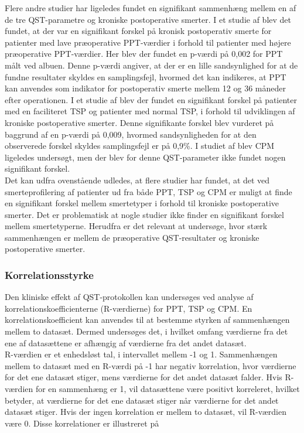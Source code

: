 Flere andre studier har ligeledes fundet en signifikant sammenhæng mellem en af de tre QST-parametre og kroniske postoperative smerter. \citep{Wylde2013} \citep{Wright2015} I et studie af  blev det fundet, at der var en signifikant forskel på kronisk postoperativ smerte for patienter med lave præoperative PPT-værdier i forhold til patienter med højere præoperative PPT-værdier. Her blev der fundet en p-værdi på 0,002 for PPT målt ved albuen. Denne p-værdi angiver, at der er en lille sandsynlighed for at de fundne resultater skyldes en samplingsfejl, hvormed det kan indikeres, at PPT kan anvendes som indikator for postoperativ smerte mellem 12 og 36 måneder efter operationen. \citep{Wright2015} I et studie af  blev der fundet en signifikant forskel på patienter med en faciliteret TSP og patienter med normal TSP, i forhold til udviklingen af kroniske postoperative smerter. Denne signifikante forskel blev vurderet på baggrund af en p-værdi på 0,009, hvormed sandsynligheden for at den observerede forskel skyldes samplingsfejl er på 0,9\%. I studiet af  blev CPM ligeledes undersøgt, men der blev for denne QST-parameter ikke fundet nogen signifikant forskel. \\
Det kan udfra ovenstående udledes, at flere studier har fundet, at det ved smerteprofilering af patienter ud fra både PPT, TSP og CPM er muligt at finde en signifikant forskel mellem smertetyper i forhold til kroniske postoperative smerter. Det er problematisk at nogle studier ikke finder en signifikant forskel mellem smertetyperne. \citep{Leary2016} Herudfra er det relevant at undersøge, hvor stærk sammenhængen er mellem de præoperative QST-resultater og kroniske postoperative smerter.

\subsubsection{Korrelationsstyrke}
Den kliniske effekt af QST-protokollen kan undersøges ved analyse af korrelationskoefficienterne (R-værdierne) for PPT, TSP og CPM. En korrelationskoefficient kan anvendes til at bestemme styrken af sammenhængen mellem to datasæt. Dermed undersøges det, i hvilket omfang værdierne fra det ene af datasættene er afhængig af værdierne fra det andet datasæt. \citep{Zar2010} \\
R-værdien er et enhedsløst tal, i intervallet mellem -1 og 1. Sammenhængen mellem to datasæt med en R-værdi på -1 har negativ korrelation, hvor værdierne for det ene datasæt stiger, mens værdierne for det andet datasæt falder. Hvis R-værdien for en sammenhæng er 1, vil datasættene være positivt korreleret, hvilket betyder, at værdierne for det ene datasæt stiger når værdierne for det andet datasæt stiger. Hvis der ingen korrelation er mellem to datasæt, vil R-værdien være 0. \citep{Zar2010} Disse korrelationer er illustreret på 


